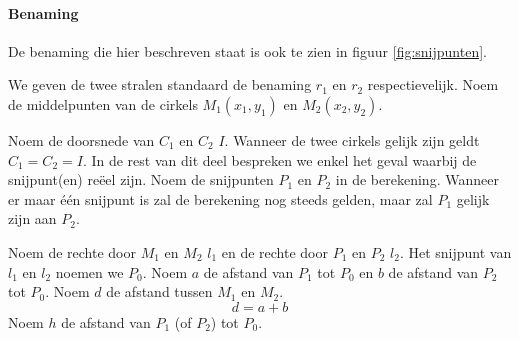 \paragraph{Benaming}
De benaming die hier beschreven staat is ook te zien in figuur \ref{fig:snijpunten}.

We geven de twee stralen standaard de benaming $r_1$ en $r_2$ respectievelijk.
Noem de middelpunten van de cirkels $M_1(x_1,y_1)$ en $M_2(x_2,y_2)$. 

Noem de doorsnede van $C_1$ en $C_2$ $I$. Wanneer de twee cirkels gelijk zijn geldt $C_1 = C_2 = I$.
In de rest van dit deel bespreken we enkel het geval waarbij de snijpunt(en) re\"eel zijn.
Noem de snijpunten $P_1$ en $P_2$ in de berekening.
Wanneer er maar \'e\'en snijpunt is zal de berekening nog steeds gelden, maar zal $P_1$ gelijk zijn aan $P_2$.

Noem de rechte door $M_1$ en $M_2$ $l_1$ en de rechte door $P_1$ en $P_2$ $l_2$.
Het snijpunt van $l_1$ en $l_2$ noemen we $P_0$.
Noem $a$ de afstand van $P_1$ tot $P_0$ en $b$ de afstand van $P_2$ tot $P_0$.
Noem $d$ de afstand tussen $M_1$ en $M_2$.
\[
d = a + b
\]
Noem $h$ de afstand van $P_1$ (of $P_2$) tot $P_0$.

